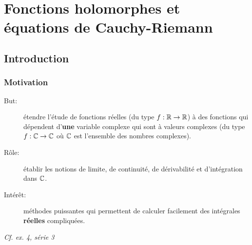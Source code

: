 \chapter{Fonctions holomorphes et équations de Cauchy-Riemann}


\section{Introduction}

\subsection{Motivation}

\begin{description}
    \item[But:] étendre l'étude de fonctions réelles (du type $f: \mathbb{R} \rightarrow \mathbb{R}$) à des fonctions qui dépendent d'\textbf{une} variable complexe qui sont à valeurs complexes (du type $f: \mathbb{C} \rightarrow \mathbb{C}$ où $\mathbb{C}$ est l'ensemble des nombres complexes).
    
    \item[Rôle:] établir les notions de limite, de continuité, de dérivabilité et d'intégration dans $\mathbb{C}$.
    
    \item[Intérêt:] méthodes puissantes qui permettent de calculer facilement des intégrales \textbf{réelles} compliquées.
\end{description}

\textit{Cf. ex. 4, série 3}
